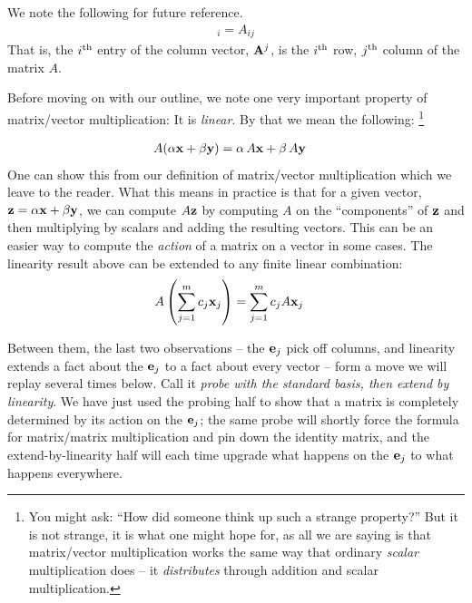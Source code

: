 \documentclass{article}
\begin{document}
We note the following for future reference.
\begin{align}
	[{\bf A}^j]_i = A_{ij} \label{vec-matrix-index}
\end{align}
That is, the $i^{\rm th}$ entry of the column vector, ${\bf A}^j$, is the
$i^{\rm th}$ row,  $j^{\rm th}$ column of the matrix $A$. 

Before moving on with our outline, we note one very important property of 
matrix/vector multiplication: It is {\em linear\/}.
By that we mean the following:%
\footnote{You might ask: ``How did someone think up such a 
strange property?'' But it is not strange, it is what one might hope for, as all we
are saying is that matrix/vector multiplication works the same way that ordinary {\em scalar\/} 
multiplication does -- it {\em distributes\/} through addition and scalar multiplication.} 

\begin{align}
	A( \alpha {\bf x} + \beta {\bf y} ) &= \alpha\, A{\bf x} + \beta\, A{\bf y}
\end{align}
One can show this from our definition of matrix/vector multiplication which we
leave to the reader. What this means in practice is that for a given vector, ${\bf z} = \alpha{\bf x} + \beta{\bf y}$,
we can compute $A {\bf z}$ by computing $A$ on the ``components'' of ${\bf z}$ and then multiplying by scalars and adding
the resulting vectors.
This can be an easier way to compute the {\em action\/} of a matrix on a vector in some cases.
The linearity result above can be extended to any finite linear
combination:
\begin{align}
	A\left( \sum_{j=1}^m c_j {\bf x}_j \right) &= \sum_{j=1}^m c_j A {\bf x}_j
\end{align}

Between them, the last two observations -- the ${\bf e}_j$ pick off columns,
and linearity extends a fact about the ${\bf e}_j$ to a fact about every vector
-- form a move we will replay several times below. Call it {\em probe with the
standard basis, then extend by linearity\/}. We have just used the probing half
to show that a matrix is completely determined by its action on the
${\bf e}_j$; the same probe will shortly force the formula for matrix/matrix
multiplication and pin down the identity matrix, and the extend-by-linearity
half will each time upgrade what happens on the ${\bf e}_j$ to what happens
everywhere.
\end{document}
